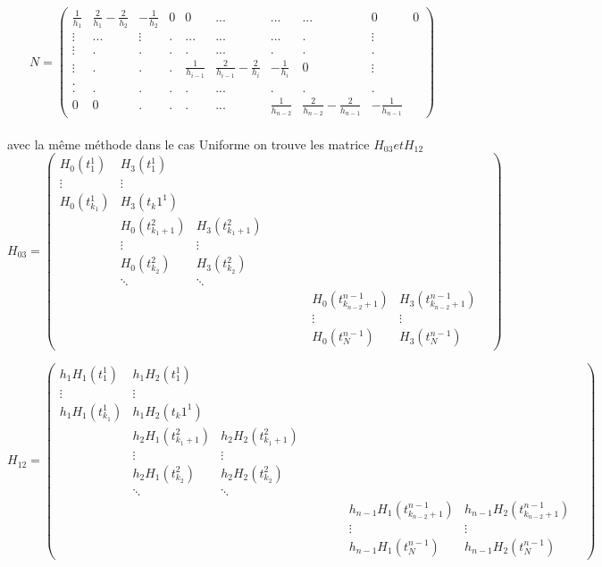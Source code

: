 \documentclass[11pt]{report}
\begin{document}
\\
\\$$N=\begin{pmatrix} \frac{1}{h_1}&\frac{2}{h_1}-\frac{2}{h_2}&-\frac{1}{h_2}&0&0&...&...&...&0&0 \\ \vdots&...&\vdots&.&...&...&...&.&\vdots \\ \vdots&.&.&.&.&...&.&.&.\\ \vdots&.&.&.&\frac{1}{h_{i-1}}&\frac{2}{h_{i-1}}-\frac{2}{h_i}&-\frac{1}{h_i}&0&\vdots \\. \\.&.&.&.&.&...&.&.&. \\ 0&0&.&.&.&...&\frac{1}{h_{n-2}}&\frac{2}{h_{n-2}}-\frac{2}{h_{n-1}}&-\frac{1}{h_{n-1}} \end{pmatrix}$$\\
avec la même méthode dans le cas Uniforme on trouve les matrice $H_{03} et H_{12}$
$$H_{03}=\begin{pmatrix} H_0(t_1^1)&H_3(t_1^1)& & & & & & & &  \\ \vdots&\vdots& & & & & & &  \\ H_0(t_{k_1}^1)&H_3(t_k1^1)& & & & & & & \\ &H_0(t_{{k_1}+1}^2)&H_3(t_{{k_1}+1}^2)& & & & & &   \\ &\vdots&\vdots& & & & & &  \\ &H_0(t_{k_2}^2)&H_3(t_{k_2}^2)& & & & & & \\ &\ddots&\ddots & & & & & & & \\ & & & & & & &H_0(t_{{k_{n-2}}+1}^{n-1}) &H_3(t_{{k_{n-2}}+1}^{n-1})\\ & & & & & & &\vdots &\vdots\\ & & & & & & &H_0(t_N^{n-1}) &H_3(t_N^{n-1}) \end{pmatrix}$$


$$H_{12}=\begin{pmatrix} h_1H_1(t_1^1)&h_1H_2(t_1^1)& & & & & & & &  \\ \vdots&\vdots& & & & & & &  \\ h_1H_1(t_{k_1}^1)&h_1H_2(t_k1^1)& & & & & & & \\ &h_2H_1(t_{{k_1}+1}^2)&h_2H_2(t_{{k_1}+1}^2)& & & & & &   \\ &\vdots&\vdots& & & & & &  \\ &h_2H_1(t_{k_2}^2)&h_2H_2(t_{k_2}^2)& & & & & & \\ &\ddots&\ddots & & & & & & & \\ & & & & & & &h_{n-1}H_1(t_{{k_{n-2}}+1}^{n-1}) &h_{n-1}H_2(t_{{k_{n-2}}+1}^{n-1})\\ & & & & & & &\vdots &\vdots\\ & & & & & & &h_{n-1}H_1(t_N^{n-1}) &h_{n-1}H_2(t_N^{n-1}) \end{pmatrix}$$
\end{document}

